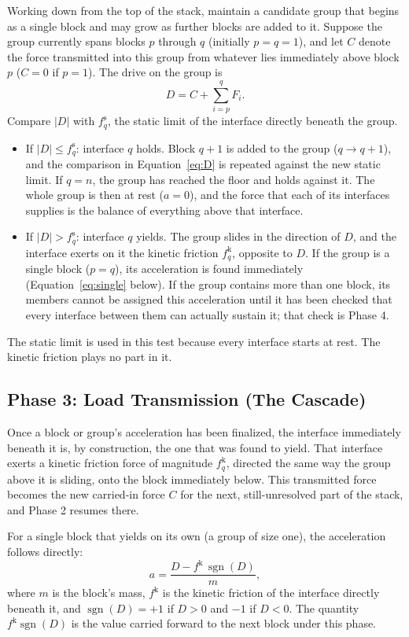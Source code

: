 \documentclass[11pt,a4paper]{article}
\newcommand{\fs}{f^{\mathrm{s}}}
\newcommand{\fkin}{f^{\mathrm{k}}}
\DeclareMathOperator{\sgn}{sgn}
\begin{document}
Working down from the top of the stack, maintain a candidate group that begins as a single block and may grow as further blocks are added to it. Suppose the group currently spans blocks $p$ through $q$ (initially $p=q=1$), and let $C$ denote the force transmitted into this group from whatever lies immediately above block $p$ ($C=0$ if $p=1$). The drive on the group is
\begin{equation}\label{eq:D}
D=C+\sum_{i=p}^{q}F_i .
\end{equation}
Compare $|D|$ with $\fs_q$, the static limit of the interface directly beneath the group.
\begin{itemize}
\item If $|D|\le \fs_q$: interface $q$ holds. Block $q+1$ is added to the group ($q\to q+1$), and the comparison in Equation~\eqref{eq:D} is repeated against the new static limit. If $q=n$, the group has reached the floor and holds against it. The whole group is then at rest ($a=0$), and the force that each of its interfaces supplies is the balance of everything above that interface.
\item If $|D|>\fs_q$: interface $q$ yields. The group slides in the direction of $D$, and the interface exerts on it the kinetic friction $\fkin_q$, opposite to $D$. If the group is a single block ($p=q$), its acceleration is found immediately (Equation~\eqref{eq:single} below). If the group contains more than one block, its members cannot be assigned this acceleration until it has been checked that every interface between them can actually sustain it; that check is Phase 4.
\end{itemize}
The static limit is used in this test because every interface starts at rest. The kinetic friction plays no part in it.

\subsection{Phase 3: Load Transmission (The Cascade)}

Once a block or group's acceleration has been finalized, the interface immediately beneath it is, by construction, the one that was found to yield. That interface exerts a kinetic friction force of magnitude $\fkin_q$, directed the same way the group above it is sliding, onto the block immediately below. This transmitted force becomes the new carried-in force $C$ for the next, still-unresolved part of the stack, and Phase 2 resumes there.

For a single block that yields on its own (a group of size one), the acceleration follows directly:
\begin{equation}\label{eq:single}
a=\frac{D-\fkin\,\sgn(D)}{m},
\end{equation}
where $m$ is the block's mass, $\fkin$ is the kinetic friction of the interface directly beneath it, and $\sgn(D)=+1$ if $D>0$ and $-1$ if $D<0$. The quantity $\fkin\sgn(D)$ is the value carried forward to the next block under this phase.
\end{document}
